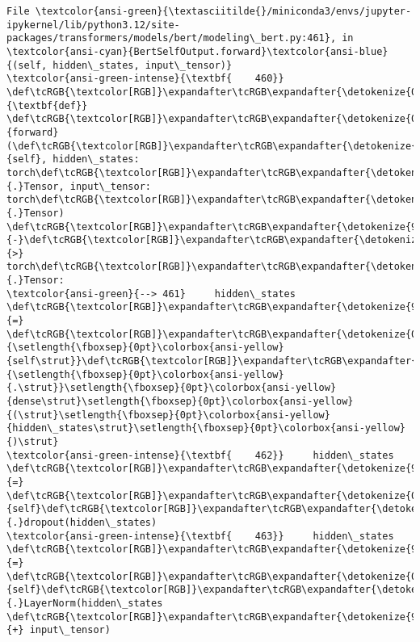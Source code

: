 \documentclass[11pt]{article}
\begin{document}
\begin{Verbatim}[commandchars=\\\{\}, frame=single, framerule=2mm, rulecolor=\color{outerrorbackground}]
File \textcolor{ansi-green}{\textasciitilde{}/miniconda3/envs/jupyter-ipykernel/lib/python3.12/site-packages/transformers/models/bert/modeling\_bert.py:461}, in \textcolor{ansi-cyan}{BertSelfOutput.forward}\textcolor{ansi-blue}{(self, hidden\_states, input\_tensor)}
\textcolor{ansi-green-intense}{\textbf{    460}} \def\tcRGB{\textcolor[RGB]}\expandafter\tcRGB\expandafter{\detokenize{0,135,0}}{\textbf{def}} \def\tcRGB{\textcolor[RGB]}\expandafter\tcRGB\expandafter{\detokenize{0,0,255}}{forward}(\def\tcRGB{\textcolor[RGB]}\expandafter\tcRGB\expandafter{\detokenize{0,135,0}}{self}, hidden\_states: torch\def\tcRGB{\textcolor[RGB]}\expandafter\tcRGB\expandafter{\detokenize{98,98,98}}{.}Tensor, input\_tensor: torch\def\tcRGB{\textcolor[RGB]}\expandafter\tcRGB\expandafter{\detokenize{98,98,98}}{.}Tensor) \def\tcRGB{\textcolor[RGB]}\expandafter\tcRGB\expandafter{\detokenize{98,98,98}}{-}\def\tcRGB{\textcolor[RGB]}\expandafter\tcRGB\expandafter{\detokenize{98,98,98}}{>} torch\def\tcRGB{\textcolor[RGB]}\expandafter\tcRGB\expandafter{\detokenize{98,98,98}}{.}Tensor:
\textcolor{ansi-green}{--> 461}     hidden\_states \def\tcRGB{\textcolor[RGB]}\expandafter\tcRGB\expandafter{\detokenize{98,98,98}}{=} \def\tcRGB{\textcolor[RGB]}\expandafter\tcRGB\expandafter{\detokenize{0,135,0}}{\setlength{\fboxsep}{0pt}\colorbox{ansi-yellow}{self\strut}}\def\tcRGB{\textcolor[RGB]}\expandafter\tcRGB\expandafter{\detokenize{98,98,98}}{\setlength{\fboxsep}{0pt}\colorbox{ansi-yellow}{.\strut}}\setlength{\fboxsep}{0pt}\colorbox{ansi-yellow}{dense\strut}\setlength{\fboxsep}{0pt}\colorbox{ansi-yellow}{(\strut}\setlength{\fboxsep}{0pt}\colorbox{ansi-yellow}{hidden\_states\strut}\setlength{\fboxsep}{0pt}\colorbox{ansi-yellow}{)\strut}
\textcolor{ansi-green-intense}{\textbf{    462}}     hidden\_states \def\tcRGB{\textcolor[RGB]}\expandafter\tcRGB\expandafter{\detokenize{98,98,98}}{=} \def\tcRGB{\textcolor[RGB]}\expandafter\tcRGB\expandafter{\detokenize{0,135,0}}{self}\def\tcRGB{\textcolor[RGB]}\expandafter\tcRGB\expandafter{\detokenize{98,98,98}}{.}dropout(hidden\_states)
\textcolor{ansi-green-intense}{\textbf{    463}}     hidden\_states \def\tcRGB{\textcolor[RGB]}\expandafter\tcRGB\expandafter{\detokenize{98,98,98}}{=} \def\tcRGB{\textcolor[RGB]}\expandafter\tcRGB\expandafter{\detokenize{0,135,0}}{self}\def\tcRGB{\textcolor[RGB]}\expandafter\tcRGB\expandafter{\detokenize{98,98,98}}{.}LayerNorm(hidden\_states \def\tcRGB{\textcolor[RGB]}\expandafter\tcRGB\expandafter{\detokenize{98,98,98}}{+} input\_tensor)


\end{Verbatim}
\end{document}

